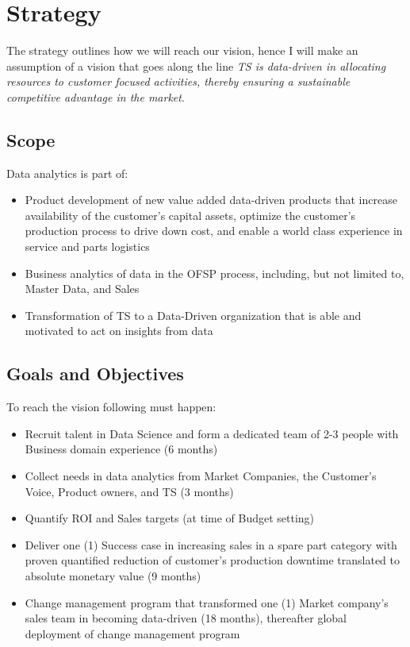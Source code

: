 \documentclass[10pt]{article} %
\begin{document}
\section{Strategy}
The strategy outlines how we will reach our vision, hence I will make an assumption of a vision that goes along the line \textit{TS is data-driven in allocating resources to customer focused activities, thereby ensuring a sustainable competitive advantage in the market}.

\subsection{Scope}

Data analytics is part of:
\begin{itemize}
			\item Product development of new value added data-driven products that increase availability of the customer's capital assets, optimize the customer's production process to drive down cost, and enable a world class experience in service and parts logistics 	
			\item Business analytics of data in the OFSP process, including, but not limited to, Master Data, and Sales 
			\item  Transformation of TS to a Data-Driven organization that is able and motivated to act on insights from data 
\end{itemize}

\subsection{Goals and Objectives}

To reach the vision following must happen:
\begin{itemize}
				\item Recruit talent in Data Science and form a dedicated team of 2-3 people with Business domain experience (6 months)
				\item Collect needs in data analytics from Market Companies, the Customer's Voice, Product owners, and TS (3 months)
				\item Quantify ROI and Sales targets (at time of Budget setting)
				\item Deliver one (1) Success case in increasing sales in a spare part category with proven quantified reduction of customer's production downtime translated to absolute monetary value (9 months)
				\item Change management program that transformed one (1) Market company's sales team in becoming data-driven (18 months), thereafter global deployment of change management program
\end{itemize}
\end{document}
